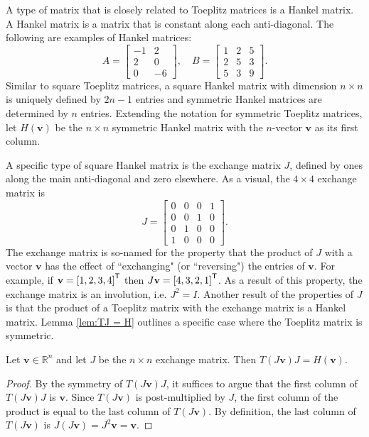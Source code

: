 A type of matrix that is closely related to Toeplitz matrices is a Hankel matrix. A Hankel matrix is a matrix that is constant along each anti-diagonal. The following are examples of Hankel matrices:
\[A = \begin{bmatrix}
-1 & 2 \\
2 & 0 \\
0 & -6
\end{bmatrix}, \quad 
B = \begin{bmatrix}
1 & 2 & 5 \\
2 & 5 & 3 \\
5 & 3 & 9
\end{bmatrix}.\]
Similar to square Toeplitz matrices, a square Hankel matrix with dimension $n \times n$ is uniquely defined by $2n -1$ entries and symmetric Hankel matrices are determined by $n$ entries. Extending the notation for symmetric Toeplitz matrices, let $H(\mathbf{v})$ be the $n \times n$ symmetric Hankel matrix with the $n$-vector $\mathbf{v}$ as its first column. \par
A specific type of square Hankel matrix is the exchange matrix $J$, defined by ones along the main anti-diagonal and zero elsewhere. As a visual, the $4 \times 4$ exchange matrix is
\[J = \begin{bmatrix}
0 & 0 & 0 & 1 \\
0 & 0 & 1 & 0 \\
0 & 1 & 0 & 0 \\
1 & 0  & 0 & 0
\end{bmatrix}.\]
The exchange matrix is so-named for the property that the product of $J$ with a vector $\mathbf{v}$ has the effect of ``exchanging" (or ``reversing") the entries of $\mathbf{v}$. For example, if $\mathbf{v} = {[1,2,3,4]}^\mathsf{T}$ then $J\mathbf{v} = {[4,3,2,1]}^\mathsf{T}$. As a result of this property, the exchange matrix is an involution, i.e. $J^2 = I$. Another result of the properties of $J$ is that the product of a Toeplitz matrix with the exchange matrix is a Hankel matrix. Lemma \ref{lem:TJ = H} outlines a specific case where the Toeplitz matrix is symmetric.
\begin{lemma}
\label{lem:TJ = H}
Let $\mathbf{v} \in \mathbb{R}^n$ and let $J$ be the $n \times n$ exchange matrix. Then $T(J\mathbf{v})J = H(\mathbf{v})$.
\end{lemma}
\begin{proof}
By the symmetry of $T(J\mathbf{v})J$, it suffices to argue that the first column of $T(J\mathbf{v})J$ is $\mathbf{v}$. Since $T(J\mathbf{v})$ is post-multiplied by $J$, the first column of the product is equal to the last column of $T(J\mathbf{v})$. By definition, the last column of $T(J\mathbf{v})$ is $J(J\mathbf{v}) = J^2\mathbf{v} = \mathbf{v}$.
\end{proof}
